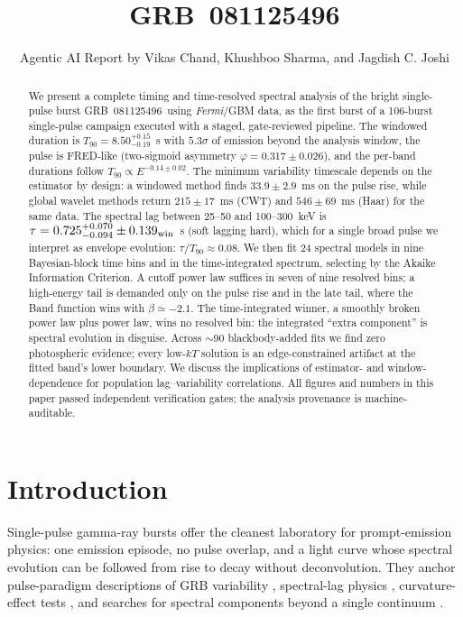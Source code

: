 \documentclass[twocolumn]{aastex631}
\newcommand{\grb}{GRB~081125496}
\begin{document}
\title{\grb}

\author{Agentic AI Report by Vikas Chand, Khushboo Sharma, and Jagdish C. Joshi}
\noaffiliation

\begin{abstract}
We present a complete timing and time-resolved spectral analysis of the bright
single-pulse burst \grb\ using \textit{Fermi}/GBM data, as the first burst of a
106-burst single-pulse campaign executed with a staged, gate-reviewed pipeline.
The windowed duration is $T_{90} = 8.50^{+0.15}_{-0.19}$~s with $5.3\sigma$ of
emission beyond the analysis window, the pulse is FRED-like (two-sigmoid
asymmetry $\varphi = 0.317 \pm 0.026$), and the per-band durations follow
$T_{90} \propto E^{-0.14 \pm 0.02}$. The minimum variability timescale depends
on the estimator by design: a windowed method finds $33.9 \pm 2.9$~ms on the
pulse rise, while global wavelet methods return $215 \pm 17$~ms (CWT) and
$546 \pm 69$~ms (Haar) for the same data. The spectral lag between 25--50 and
100--300~keV is $\tau = 0.725^{+0.070}_{-0.094} \pm 0.139_{\rm win}$~s (soft lagging hard), which
for a single broad pulse we interpret as envelope evolution: $\tau/T_{90}
\approx 0.08$. We then fit 24 spectral models in nine Bayesian-block time bins
and in the time-integrated spectrum, selecting by the Akaike Information
Criterion. A cutoff power law suffices in seven of nine resolved bins; a
high-energy tail is demanded only on the pulse rise and in the late tail, where
the Band function wins with $\beta \simeq -2.1$. The time-integrated winner, a
smoothly broken power law plus power law, wins no resolved bin: the integrated
``extra component'' is spectral evolution in disguise. Across $\sim$90
blackbody-added fits we find zero photospheric evidence; every low-$kT$
solution is an edge-constrained artifact at the fitted band's lower boundary.
We discuss the implications of estimator- and window-dependence for population
lag--variability correlations. All figures and numbers in this paper passed
independent verification gates; the analysis provenance is machine-auditable.
\end{abstract}


\section{Introduction} \label{sec:intro}

Single-pulse gamma-ray bursts offer the cleanest laboratory for prompt-emission
physics: one emission episode, no pulse overlap, and a light curve whose
spectral evolution can be followed from rise to decay without deconvolution.
They anchor pulse-paradigm descriptions of GRB variability
\citep{1996ApJ...459..393N,2003ApJ...596..389K}, spectral-lag physics
\citep{2010ApJ...711.1073U,2012MNRAS.419..614U}, curvature-effect tests
\citep{2013ApJ...778....3S}, and searches for spectral components beyond a
single continuum \citep{2019A&A...625A..60R,2019ApJ...886...20Y}.
\end{document}
